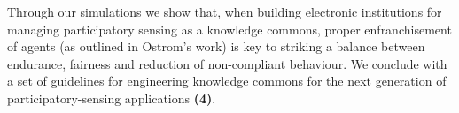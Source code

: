 Through our simulations we show that, when building electronic institutions for managing participatory sensing as a knowledge commons, proper enfranchisement of agents (as outlined in Ostrom's work) is key to striking a balance between endurance, fairness and reduction of non-compliant behaviour. We conclude with a set of guidelines for engineering knowledge commons for the next generation of participatory-sensing applications \textbf{(4)}.


